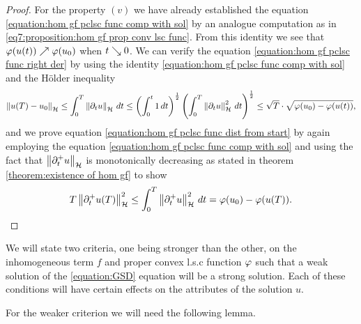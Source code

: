 \begin{proof}
	For the property $ (v) $ we have
	already established the equation 
	\eqref{equation:hom gf pclsc func comp with sol}
	by an analogue computation as in 
	\eqref{eq7:proposition:hom gf prop conv lsc func}. From
	this identity we see that $ \varphi(u(t))\nearrow\varphi(u_0) $
	when $ t\searrow 0 $. We can verify the equation 
	\eqref{equation:hom gf pclsc func right der}
	by using the
	identity \eqref{equation:hom gf pclsc func comp with sol}
	and the Hölder inequality  
	\begin{align*}
		\left\Vert u(T)-u_0\right\Vert_{\mathcal{H}}
		\leq\int_0^T\left\Vert \partial_t u\right\Vert_{\mathcal{H}}\,dt
		\leq \left(\int_0^t 1\,dt\right)^{\frac{1}{2}}
		\left(\int_0^T\left\Vert \partial_t u\right\Vert_{\mathcal{H}}^2\,dt\right)^{\frac{1}{2}}
		\leq \sqrt{T}\cdot \sqrt{\varphi(u_0)-\varphi(u(t))},
	\end{align*}
	and we prove equation \eqref{equation:hom gf pclsc func dist from start}
	by again employing the equation
	\eqref{equation:hom gf pclsc func comp with sol}
	and using the fact that $ \left\Vert \partial_t^+ u\right\Vert_{\mathcal{H}} $ is monotonically decreasing
	as stated in theorem \ref{theorem:existence of hom gf} to show
	\begin{align*}
		T\left\Vert \partial_t^+ u(T)\right\Vert_{\mathcal{H}}^2
		\leq \int_0^T\left\Vert \partial_t^+ u\right\Vert_{\mathcal{H}}^2\,dt
		=\varphi(u_0)-\varphi(u(T)).
	\end{align*}
\end{proof}

We will state two criteria, one being stronger than the other, 
on the inhomogeneous
term $ f $ and proper convex l.s.c function
$ \varphi $ such that a weak solution
of the \ref{equation:GSD} equation will be a strong solution. 
Each of these conditions will have certain effects on
the attributes of the solution $ u $. \medskip

For the weaker criterion we will need the following lemma.

